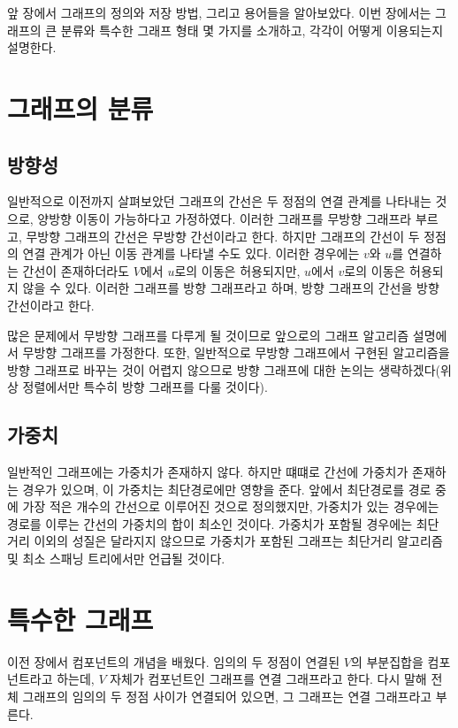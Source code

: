 앞 장에서 그래프의 정의와 저장 방법, 그리고 용어들을 알아보았다. 이번 장에서는 그래프의 큰 분류와 특수한 그래프 형태 몇 가지를 소개하고, 각각이 어떻게 이용되는지 설명한다.

\section{그래프의 분류}

\subsection{방향성}
일반적으로 이전까지 살펴보았던 그래프의 간선은 두 정점의 연결 관계를 나타내는 것으로, 양방향 이동이 가능하다고 가정하였다. 이러한 그래프를 무방향 그래프라 부르고, 무방향 그래프의 간선은 무방향 간선이라고 한다.
하지만 그래프의 간선이 두 정점의 연결 관계가 아닌 이동 관계를 나타낼 수도 있다. 이러한 경우에는 $v$와 $u$를 연결하는 간선이 존재하더라도 $V$에서 $u$로의 이동은 허용되지만, $u$에서 $v$로의 이동은 허용되지 않을 수 있다.
이러한 그래프를 방향 그래프라고 하며, 방향 그래프의 간선을 방향 간선이라고 한다.

많은 문제에서 무방향 그래프를 다루게 될 것이므로 앞으로의 그래프 알고리즘 설명에서 무방향 그래프를 가정한다. 또한, 일반적으로 무방향 그래프에서 구현된 알고리즘을 방향 그래프로 바꾸는 것이 어렵지 않으므로 방향 그래프에 대한 논의는 생략하겠다(위상 정렬에서만 특수히 방향 그래프를 다룰 것이다).

\subsection{가중치}
일반적인 그래프에는 가중치가 존재하지 않다. 하지만 떄떄로 간선에 가중치가 존재하는 경우가 있으며, 이 가중치는 최단경로에만 영향을 준다. 앞에서 최단경로를 경로 중에 가장 적은 개수의 간선으로 이루어진 것으로 정의했지만, 가중치가 있는 경우에는 경로를 이루는 간선의 가중치의 합이 최소인 것이다.
가중치가 포함될 경우에는 최단 거리 이외의 성질은 달라지지 않으므로 가중치가 포함된 그래프는 최단거리 알고리즘 및 최소 스패닝 트리에서만 언급될 것이다.

\section{특수한 그래프}

이전 장에서 컴포넌트의 개념을 배웠다. 임의의 두 정점이 연결된 $V$의 부분집합을 컴포넌트라고 하는데, $V$ 자체가 컴포넌트인 그래프를 연결 그래프라고 한다. 다시 말해 전체 그래프의 임의의 두 정점 사이가 연결되어 있으면, 그 그래프는 연결 그래프라고 부른다.

